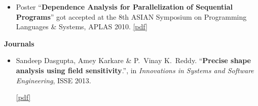 \documentclass[9pt]{article}
\newenvironment{changemargin}[2]{%
  \begin{list}{}{%
    \setlength{\topsep}{0pt}%
    \setlength{\leftmargin}{#1}%
    \setlength{\rightmargin}{#2}%
    \setlength{\listparindent}{\parindent}%
    \setlength{\itemindent}{\parindent}%
    \setlength{\parsep}{\parskip}%
  }%
  \item[]}{\end{list}
}
\newcommand{\cmnt}[1]{}
\newenvironment{body} {
	\vspace*{-16pt}
	\begin{changemargin}{-0.25in}{-0.5in}
  }	
	{\end{changemargin}
}
\begin{document}
\begin{body}
\begin{itemize}
                \item Poster ``\textbf{Dependence Analysis for Parallelization
                  of Sequential Programs}'' got accepted at the 8th ASIAN
                  Symposium on Programming Languages \& Systems, APLAS 2010.
                  \href{http://webhost.engr.illinois.edu/~sdasgup3/Document/poster_APLAS2010.pdf}{[pdf]}
	\end{itemize}

\textbf{Journals}\\
	\vspace{-4pt}
	\begin{itemize} \itemsep -0pt
		\item  Sandeep Dasgupta, Amey Karkare \& P.\ Vinay K.\ Reddy. ``\textbf{Precise shape analysis using field sensitivity}.'', in \emph{Innovations in Systems and Software Engineering}, ISSE 2013.
                 \cmnt{ doi: \href{http://www.springerlink.com/openurl.asp?genre=article&id=doi:10.1007/s11334-013-0198-7}{10.1007/s11334-013-0198-7}. }
                 \href{http://webhost.engr.illinois.edu/~sdasgup3/Document/publication_isse.pdf}{[pdf]}
	\end{itemize}
\end{body}
\end{document}
